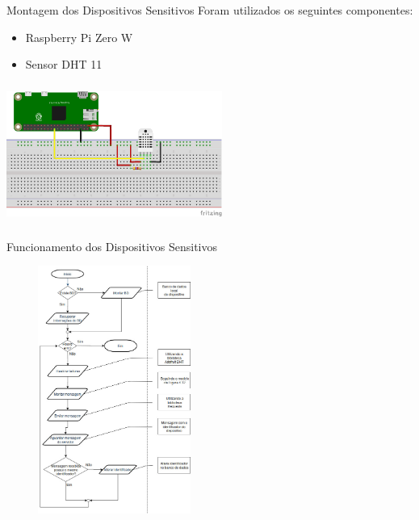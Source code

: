 \documentclass{beamer}
\begin{document}
    \begin{frame}{Montagem dos Dispositivos Sensitivos}
      \quad Foram utilizados os seguintes componentes:
      \begin{itemize}
        \item Raspberry Pi Zero W
        \item Sensor DHT 11
      \end{itemize}
      \begin{center}
      \includegraphics[height=130pt, width=200pt]{sensor}
      \end{center}
    \end{frame}

    \begin{frame}{Funcionamento dos Dispositivos Sensitivos}
      \begin{center}
      \includegraphics[height=230pt, width=200pt]{fluxogramaSensor}
      \end{center}
    \end{frame}
\end{document}
